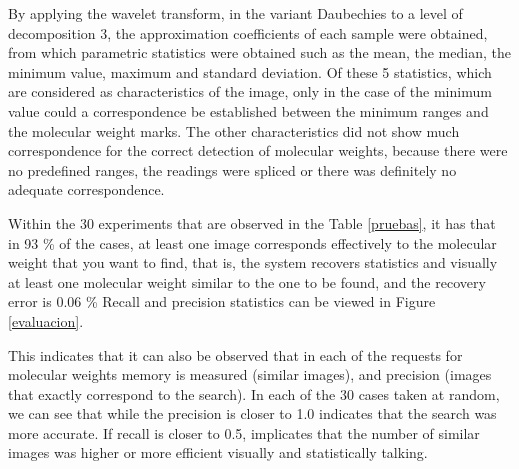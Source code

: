 \documentclass[a4paper]{llncs}
\begin{document}
By applying the wavelet transform, in the variant Daubechies to a level of decomposition 3, the approximation coefficients of each sample were obtained, from which parametric statistics were obtained such as the mean, the median, the minimum value, maximum and standard deviation. Of these 5 statistics, which are considered as characteristics of the image, only in the case of the minimum value could a correspondence be established between the minimum ranges and the molecular weight marks. The other characteristics did not show much correspondence for the correct detection of molecular weights, because there were no predefined ranges, the readings were spliced or there was definitely no adequate correspondence.

Within the 30 experiments that are observed in the Table \ref{pruebas}, it has that in 93 \% of the cases, at least one image corresponds effectively to the molecular weight that you want to find, that is, the system recovers statistics and visually at least one molecular weight similar to the one to be found, and the recovery error is 0.06 \% Recall and precision statistics can be viewed in Figure \ref{evaluacion}. 


This indicates that it can also be observed that in each of the requests for molecular weights memory is measured (similar images), and precision (images that exactly correspond to the search). In each of the 30 cases taken at random, we can see that while the precision is closer to 1.0 indicates that the search was more accurate. If recall is closer to 0.5, implicates that the number of similar images was higher or more efficient visually and statistically talking. 


 
\end{document}
